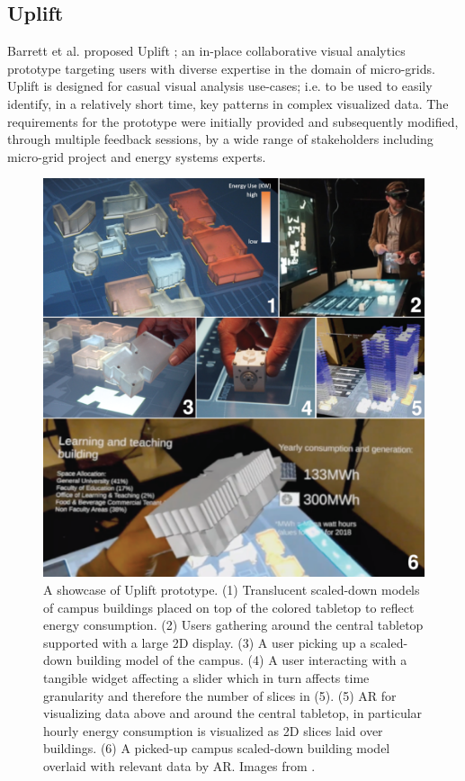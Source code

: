 \documentclass{vgtc}                          %
\begin{document}
\subsection{Uplift}
Barrett et al. proposed Uplift \cite{uplift_prototype}; an in-place
collaborative visual analytics prototype targeting users with diverse
expertise in the domain of micro-grids. Uplift is designed for casual visual
analysis use-cases; i.e. to be used to easily identify, in a relatively short
time, key patterns in complex visualized data. The requirements for the
prototype were initially provided and subsequently modified, through multiple
feedback sessions, by a wide range of stakeholders including micro-grid project
and energy systems experts.

\begin{figure}[tb]
	\centering
	\includegraphics[width=\columnwidth]{uplift}
	\caption[Caption for Uplift]{A showcase of Uplift prototype. (1)
		Translucent scaled-down models of campus buildings placed on top of the
		colored tabletop to reflect energy consumption. (2) Users gathering
		around the central tabletop supported with a large 2D display. (3)
		A user picking up a scaled-down building model of the campus. (4)
		A user interacting with a tangible widget affecting a slider which
		in turn affects time granularity and therefore the number of slices
		in (5). (5) AR for visualizing data above and around the central
		tabletop, in particular hourly energy consumption is visualized as 2D
		slices laid over buildings. (6) A picked-up campus scaled-down building
		model overlaid with relevant data by AR.
		Images from \cite{uplift_prototype}.}
	\label{fig:uplift}
\end{figure}
\end{document}
